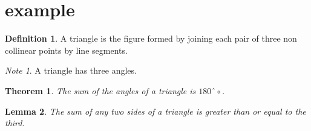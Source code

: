 \documentclass{article}
\newtheorem{thm}{Theorem}[section]
\theoremstyle{definition}
\newtheorem{dfn}{Definition}[section]
\theoremstyle{remark}
\newtheorem{note}{Note}[section]
\theoremstyle{plain}
\newtheorem{lem}[thm]{Lemma}
\begin{document}
\section{example}
\begin{dfn}
A triangle is the figure formed by joining each pair
of three non collinear points by line segments.
\end{dfn}
\begin{note}
A triangle has three angles.
\end{note}
\begin{thm}
The sum of the angles of a triangle is $180ˆ\circ$.
\end{thm}
\begin{lem}
The sum of any two sides of a triangle is greater than or equal to the third.
\end{lem}
\end{document}
